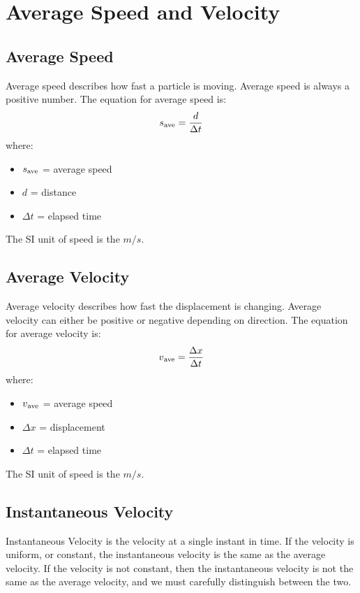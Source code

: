 \section{Average Speed and Velocity}
	
\subsection{Average Speed}
Average speed describes how fast a particle is moving. Average speed is always a positive number. The equation for average speed is: \[s\textsubscript{ave} = \frac{d}{\Delta t}\] where: 
\begin{itemize}
	\item $s\textsubscript{ave}$ = average speed
	\item $d$ = distance
	\item $\Delta t$ = elapsed time
\end{itemize}
The SI unit of speed is the $m/s$.

\subsection{Average Velocity}
Average velocity describes how fast the displacement is changing. Average velocity can either be positive or negative depending on direction. The equation for average velocity is: \[v\textsubscript{ave} = \frac{\Delta x}{\Delta t}\] where:
\begin{itemize}
	\item $v\textsubscript{ave}$ = average speed
	\item $\Delta x$ = displacement
	\item $\Delta t$ = elapsed time
\end{itemize}
The SI unit of speed is the $m/s$.
	
\subsection{Instantaneous Velocity}
Instantaneous Velocity is the velocity at a single instant in time. If the velocity is uniform, or constant, the instantaneous velocity is the same as the average velocity. If the velocity is not constant, then the instantaneous velocity is not the same as the average velocity, and we must carefully distinguish between the two.